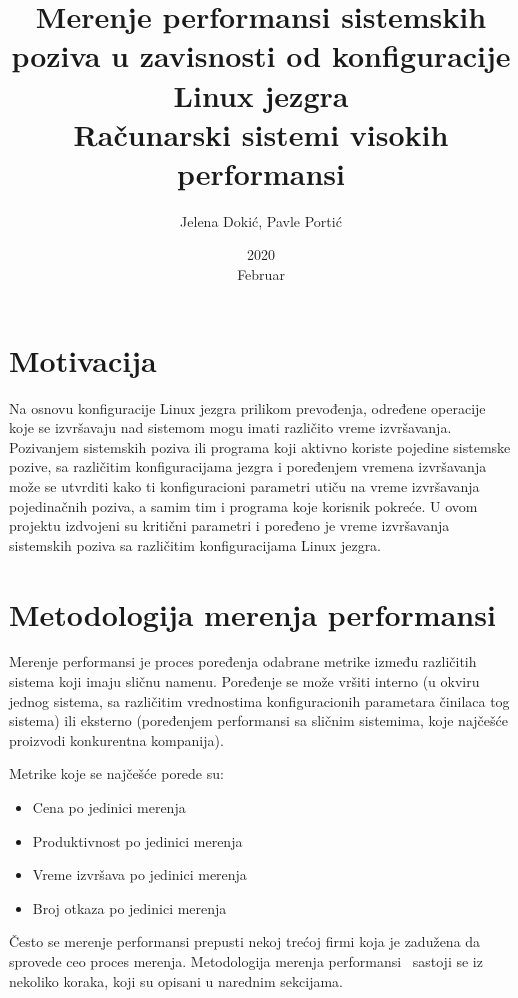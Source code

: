 \documentclass[12pt]{report}
\title{\textbf{Merenje performansi sistemskih poziva u zavisnosti od konfiguracije Linux jezgra} \protect\\ Računarski sistemi visokih performansi}
\date{2020\\ Februar}
\author{Jelena Dokić, Pavle Portić}
\newcommand\frontmatter{
    \cleardoublepage{}
    \pagenumbering{Roman}
    \setlength{\parskip}{0pt}
}
\newcommand\mainmatter{
    \cleardoublepage{}
    \pagenumbering{arabic}
    \setlength{\parskip}{2mm}
    \titleformat{\chapter}{\normalfont\Large\bf\sffamily\raggedleft}{\thechapter.}{12pt}{}
}
\begin{document}
\maketitle
\frontmatter{}

\renewcommand{\MakeUppercase}[1]{#1}
\tableofcontents
\mainmatter{}

\chapter{Motivacija}
Na osnovu konfiguracije Linux jezgra prilikom prevođenja, određene operacije koje se izvršavaju nad sistemom mogu imati različito vreme izvršavanja. Pozivanjem sistemskih poziva ili programa koji aktivno koriste pojedine sistemske pozive, sa različitim konfiguracijama jezgra i poređenjem vremena izvršavanja može se utvrditi kako ti konfiguracioni parametri utiču na vreme izvršavanja pojedinačnih poziva, a samim tim i programa koje korisnik pokreće. U ovom projektu izdvojeni su kritični parametri i poređeno je vreme izvršavanja sistemskih poziva sa različitim konfiguracijama Linux jezgra.

\chapter{Metodologija merenja performansi}
Merenje performansi je proces poređenja odabrane metrike između različitih sistema koji imaju sličnu namenu. Poređenje se može vršiti interno (u okviru jednog sistema, sa različitim vrednostima konfiguracionih parametara činilaca tog sistema) ili eksterno (poređenjem performansi sa sličnim sistemima, koje najčešće proizvodi konkurentna kompanija).

Metrike koje se najčešće porede su:
\begin{samepage}
    \begin{itemize}
        \item Cena po jedinici merenja
        \item Produktivnost po jedinici merenja
        \item Vreme izvršava po jedinici merenja
        \item Broj otkaza po jedinici merenja
    \end{itemize}
\end{samepage}

Često se merenje performansi prepusti nekoj trećoj firmi koja je zadužena da sprovede ceo proces merenja. Metodologija merenja performansi~\cite{methodology} sastoji se iz nekoliko koraka, koji su opisani u narednim sekcijama.
\end{document}
